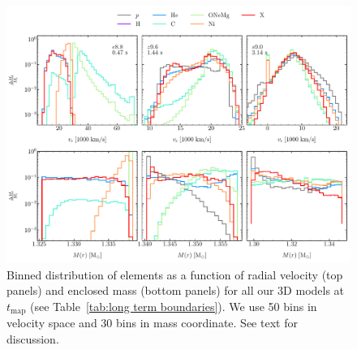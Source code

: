 \documentclass[fleqn,usenatbib]{mnras}
\begin{document}
\begin{figure}
 \centering
 \includegraphics[width=\textwidth,trim=0.0cm 0.0cm 0cm 0cm,clip]{pic/z96_s9_e8_3d_massDis_mvr_and_masstime_0_paper.pdf}
 \caption{Binned distribution of elements as a function of radial velocity (top panels) and enclosed mass (bottom panels) for all our 3D models at $t_{\mathrm{map}}$ (see Table~\ref{tab:long term boundaries}). We use 50 bins in velocity space and 30 bins in mass coordinate. See text for discussion.}
 \label{fig:mdp first mapping}
\end{figure}

\end{document}
